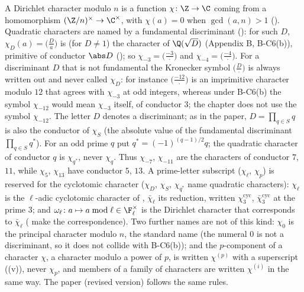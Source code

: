 \begin{convention}\label{conv:rings:characters}
A Dirichlet character modulo $n$ is a function $\chi\colon\Z\to\C$ coming from a homomorphism $(\Z/n)^\times\to\C^\times$, with
$\chi(a)=0$ when $\gcd(a,n)>1$ (). Quadratic characters are named by a fundamental discriminant
(): for such $D$, $\chi_D(a)=\bigl(\frac Da\bigr)$ is (for $D\ne1$) the character of $\Q(\sqrt D)$ (Appendix B, B-C6(b)), primitive of conductor
$\abs D$ (); so $\chi_{-3}=\bigl(\frac{-3}\cdot\bigr)$ and $\chi_{-4}=\bigl(\frac{-4}\cdot\bigr)$. For a discriminant $D$ that is not
fundamental the Kronecker symbol $\bigl(\frac D\cdot\bigr)$ is always written out and never called $\chi_D$: for instance $\bigl(\frac{-12}\cdot\bigr)$ is an imprimitive
character modulo $12$ that agrees with $\chi_{-3}$ at odd integers, whereas under B-C6(b) the symbol $\chi_{-12}$ would mean $\chi_{-3}$ itself, of conductor
$3$; the chapter does not use the symbol $\chi_{-12}$. The letter $D$ denotes a discriminant; as in the paper, $D=\prod_{q\in S}q$ is also the conductor of $\chi_S$
(the absolute value of the fundamental discriminant $\prod_{q\in S}q^*$). For an odd prime $q$
put $q^*=(-1)^{(q-1)/2}q$; the quadratic character of conductor $q$ is $\chi_{q^*}$, never $\chi_q$. Thus $\chi_{-7}$, $\chi_{-11}$ are the characters of conductor $7$, $11$, while $\chi_5$, $\chi_{13}$ have conductor $5$, $13$.
A prime-letter subscript ($\chi_\ell$, $\chi_p$) is reserved for the cyclotomic character ($\chi_D$, $\chi_S$, $\chi_{q^*}$ name quadratic
characters): $\chi_\ell$ is the $\ell$-adic cyclotomic character of
, $\bar\chi_\ell$ its reduction, written $\chi_3^{\mathrm{cyc}}$, $\bar\chi_3^{\mathrm{cyc}}$ at the prime $3$; and
$\omega_\ell\colon a\mapsto a\bmod\ell\in\F_\ell^\times$ is the Dirichlet character that corresponds to $\bar\chi_\ell$ (
make the correspondence). Two further names are not of this kind: $\chi_0$ is the principal character modulo $n$, the standard
name (the numeral $0$ is not a discriminant, so it does not collide with B-C6(b)); and the $p$-component of a character $\chi$, a character
modulo a power of $p$, is written $\chi^{(p)}$ with a superscript ((v)), never $\chi_p$, and members of a family of characters are
written $\chi^{(i)}$ in the same way. The paper (revised version)
follows the same rules.
\end{convention}

